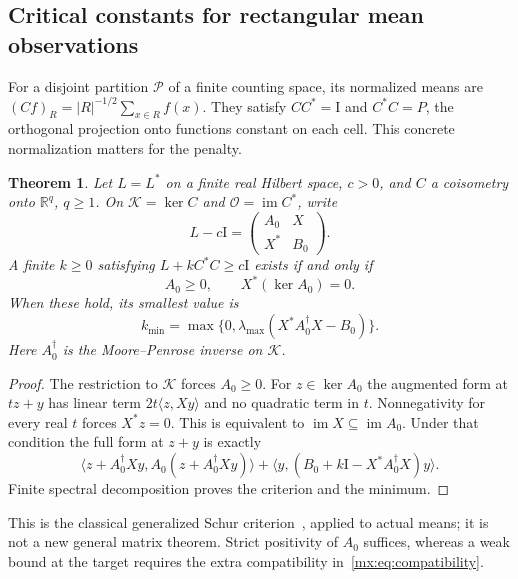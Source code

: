 \documentclass[11pt]{article}
\newcommand{\R}{\mathbb R}
\newtheorem{matrixTheorem}[theorem]{Theorem}
\providecommand{\im}{\operatorname{im}}
\providecommand{\id}{\mathrm I}
\begin{document}
\subsection{Critical constants for rectangular mean observations}
For a disjoint partition $\mathcal P$ of a finite counting space, its
normalized means are $(Cf)_R=|R|^{-1/2}\sum_{x\in R}f(x)$. They satisfy
$CC^*=\id$ and $C^*C=P$, the orthogonal projection onto functions constant
on each cell. This concrete normalization matters for the penalty.

\begin{matrixTheorem}\label{mx:thm:critical}
Let $L=L^*$ on a finite real Hilbert space, $c>0$, and $C$ a coisometry
onto $\R^q$, $q\geq1$. On $\mathcal K=\ker C$ and
$\mathcal O=\im C^*$, write
\[
 L-c\id=\begin{pmatrix}A_0&X\\X^*&B_0\end{pmatrix}.
\]
A finite $k\geq0$ satisfying $L+kC^*C\geq c\id$ exists if and only if
\begin{equation}\label{mx:eq:compatibility}
 A_0\geq0,\qquad X^*(\ker A_0)=0.
\end{equation}
When these hold, its smallest value is
\[
 k_{\min}=\max\{0,\lambda_{\max}(X^*A_0^\dagger X-B_0)\}.
\]
Here $A_0^\dagger$ is the Moore--Penrose inverse on $\mathcal K$.
\end{matrixTheorem}
\begin{proof}
The restriction to $\mathcal K$ forces $A_0\geq0$. For $z\in\ker A_0$
the augmented form at $tz+y$ has linear term $2t\langle z,Xy\rangle$
and no quadratic term in $t$. Nonnegativity for every real $t$ forces
$X^*z=0$. This is equivalent to $\im X\subseteq\im A_0$. Under that
condition the full form at $z+y$ is exactly
\[
 \langle z+A_0^\dagger Xy,A_0(z+A_0^\dagger Xy)\rangle
 +\langle y,(B_0+k\id-X^*A_0^\dagger X)y\rangle.
\]
Finite spectral decomposition proves the criterion and the minimum.
\end{proof}
This is the classical generalized Schur criterion~\cite[Theorem 1]{mx:Higham},
applied to actual means; it is not a new general matrix theorem. Strict
positivity of $A_0$ suffices, whereas a weak bound at the target requires
the extra compatibility in~\eqref{mx:eq:compatibility}.
\end{document}
